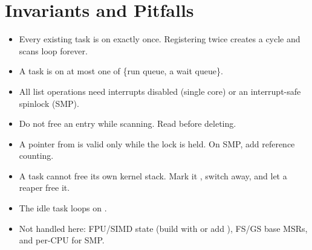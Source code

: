 \section{Invariants and Pitfalls}
\begin{itemize}
  \item Every existing task is on  exactly once. Registering
        twice creates a cycle and scans loop forever.
  \item A task is on at most one of \{run queue, a wait queue\}.
  \item All list operations need interrupts disabled (single core) or an
        interrupt-safe spinlock (SMP).
  \item Do not free an entry while scanning. Read  before deleting.
  \item A pointer from  is valid only while the lock is held.
        On SMP, add reference counting.
  \item A task cannot free its own kernel stack. Mark it ,
        switch away, and let a reaper free it.
  \item The idle task loops on .
  \item Not handled here: FPU/SIMD state (build with
         or add ), FS/GS base MSRs,
        and per-CPU  for SMP.
\end{itemize}
